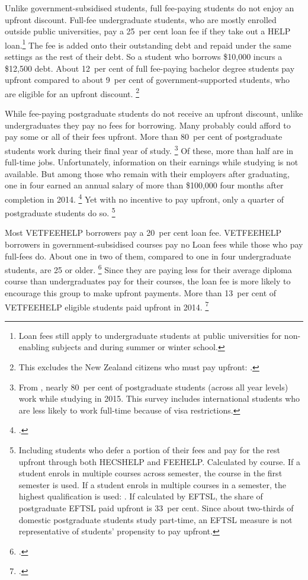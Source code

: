 \documentclass[embargoed]{grattan}
\begin{document}
Unlike government-subsidised students, full fee-paying students do not enjoy an upfront discount.
Full-fee undergraduate students, who are mostly enrolled outside public universities, pay a 25~per cent loan fee if they take out a \gls{HELP} loan.\footnote{\Gls{Loan fees} still apply to undergraduate students at public universities for non-enabling subjects and during summer or winter school.} The fee is added onto their outstanding debt and repaid under the same settings as the rest of their debt.
So a student who borrows \$10,000 incurs a \$12,500 debt.
About 12~per cent of full fee-paying bachelor degree students pay upfront compared to about 9~per cent of government-supported students, who are eligible for an upfront discount.%
\footnote{This excludes the New Zealand citizens who must pay upfront: \textcite{EducationvariousyearsHigherEducationStatistics}.}

While fee-paying postgraduate students do not receive an upfront discount, unlike undergraduates they pay no fees for borrowing.
Many probably could afford to pay some or all of their fees upfront.
More than 80~per cent of postgraduate students work during their final year of study.%
\footnote{From \textcite{ABS2016MicrodataEducationwork}, nearly 80~per cent of postgraduate students (across all year levels) work while studying in 2015.
This survey includes international students who are less likely to work full-time because of visa restrictions.} 
Of these, more than half are in full-time jobs.
Unfortunately, information on their earnings while studying is not available.
But among those who remain with their employers after graduating, one in four earned an annual salary of more than \$100,000 four months after completion in 2014.%
\footcite{GCA2015AustralianGraduateSurvey} %
Yet with no incentive to pay upfront, only a quarter of postgraduate students do so.%
\footnote{Including students who defer a portion of their fees and pay for the rest upfront through both \gls{HECSHELP} and \gls{FEEHELP}\@.
Calculated by course.
If a student enrols in multiple courses across semester, the course in the first semester is used.
If a student enrols in multiple courses in a semester, the highest qualification is used: \textcite{EducationvariousyearsHigherEducationStatistics}.
If calculated by \gls{EFTSL}, the share of postgraduate \gls{EFTSL} paid upfront is 33~per cent.
Since about two-thirds of domestic postgraduate students study part-time, an \gls{EFTSL} measure is not representative of students' propensity to pay upfront.}

Most \gls{VETFEEHELP} borrowers pay a 20~per cent loan fee.
\gls{VETFEEHELP} borrowers in government-subsidised courses pay no \gls{Loan fees} while those who pay full-fees do.
About one in two of them, compared to one in four undergraduate students, are 25 or older.%
\footcites[][Table~1]{Education20152014VETFEEa}[][Table~2.1]{Education2015StudentsSelectedhigher} %
Since they are paying less for their average diploma course than undergraduates pay for their courses, the loan fee is more likely to encourage this group to make upfront payments.
More than 13~per cent of \gls{VETFEEHELP} eligible students paid upfront in 2014.%
\footcite{Education2014VETFEEHELP}
\end{document}
